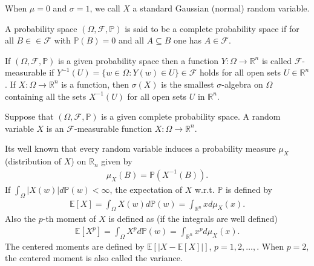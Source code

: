 	\noindent When $\mu = 0$ and $\sigma = 1$, we call $X$ a standard Gaussian (normal) random variable.
	
	\begin{definition}
		A probability space $(\Omega, \mathcal{F}, \mathbb{P})$ is said to be a complete probability space if for all $B ∈\in \mathcal{F}$ with $\mathbb{P} (B) = 0$ and all $A \subseteq B$ one has $A \in \mathcal{F}$.
	\end{definition}
	
	\begin{definition}
		If $(\Omega, \mathcal{F}, \mathbb{P})$ is a given probability space then a function $Y : \Omega \rightarrow \mathbb{R}^n$ is called $\mathcal{F}$-measurable if $Y^{-1} (U) = \{ w \in \Omega : Y(w) \in U \} \in \mathcal{F}$ holds for all open sets $U \in \mathbb{R}^n$. If $X : \Omega \rightarrow \mathbb{R}^n$ is a function, then $\sigma (X)$ is the smallest $\sigma$-algebra on $\Omega$ containing all the sets $X^{-1} (U)$ for all open sets $U$ in $\mathbb{R}^n$.
	\end{definition}
	
	\begin{definition}
		Suppose that $(\Omega, \mathcal{F}, \mathbb{P})$ is a given complete probability space. A random variable $X$ is an $\mathcal{F}$-measurable function $X : \Omega \rightarrow \mathbb{R}^n$.
	\end{definition}
	
	\noindent Its well known that every random variable induces a probability measure $\mu_X$ (distribution of $X$) on $\mathbb{R}_n$ given by
	\begin{align*}
		\mu_X (B) = \mathbb{P} (X^{-1} (B)).
	\end{align*}
	If $ \int_{\Omega} | X(w) | d \mathbb{P} (w) < \infty$, the expectation of $X$ w.r.t. $\mathbb{P}$ is defined by
	\begin{align*}
		\mathbb{E} [X] = \int_{\Omega} X(w) d \mathbb{P} (w) = \int_{\mathbb{R}^n} x d \mu_X (x).
	\end{align*}  
	Also the $p$-th moment of $X$ is defined as (if the integrals are well defined)
	\begin{align*}
		\mathbb{E} [X^p] = \int_{\Omega} X^p d \mathbb{P} (w) = \int_{\mathbb{R}^n} x^p d \mu_X (x).
	\end{align*}
	The centered moments are defined by $\mathbb{E} \left[ |X - \mathbb{E}[X]| \right]$, $p = 1, 2, \dots, $. When
	$p = 2$, the centered moment is also called the variance. \\
	

